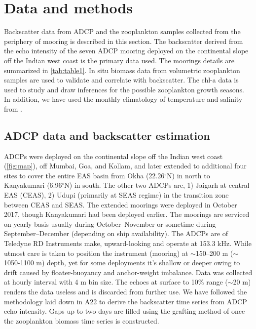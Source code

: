 \documentclass[authoryear,review,12pt]{elsarticle}
\begin{document}
	\section{Data and methods}
	Backscatter data from ADCP and the zooplankton samples collected from the periphery of mooring is described in this section. The backscatter derived from the echo intensity of the seven ADCP mooring deployed on the continental slope off the Indian west coast is the primary data used. The moorings details are summarized in \cref{tab:table1}. In situ biomass data from volumetric zooplankton samples are used to validate and correlate with backscatter. The chl-a data is used to study and draw inferences for the possible zooplankton growth seasons. In addition, we have used the monthly climatology of temperature and salinity from \citet{chatterjee2012new}. 
	
	\subsection{ADCP data and backscatter estimation}
    ADCPs were deployed on the continental slope off the Indian west coast (\cref{fig:map}), off Mumbai, Goa, and Kollam, and later extended to additional four sites to cover the entire EAS basin from Okha (22.26$^{\circ}$N) in north to Kanyakumari (6.96$^{\circ}$N) in south. The other two ADCPs are, 1) Jaigarh at central EAS (CEAS), 2) Udupi (primarily at SEAS regime) in the transition zone between CEAS and SEAS. The extended moorings were deployed in October 2017, though Kanyakumari had been deployed earlier. The moorings are serviced on yearly basis usually during October--November or sometime during September--December (depending on ship availability). The ADCPs are of Teledyne RD Instruments  make, upward-looking and operate at 153.3 kHz. While utmost care is taken to position the instrument (mooring) at  $\sim$150--200 m ($\sim$1050-1100 m) depth, yet for some deployments it's shallow or deeper owing to drift caused by floater-buoyancy and anchor-weight imbalance. Data was collected at hourly interval with 4 m bin size. The echoes at surface to 10\% range ($\sim$20 m) renders the data useless and is discarded from further use.  We have followed the methodology laid down in A22 to derive the backscatter time series from ADCP echo intensity. Gaps up to two days are filled using the grafting method of \citet{mukhopadhyay2017st} once the zooplankton biomass time series is constructed.
   
\end{document}
